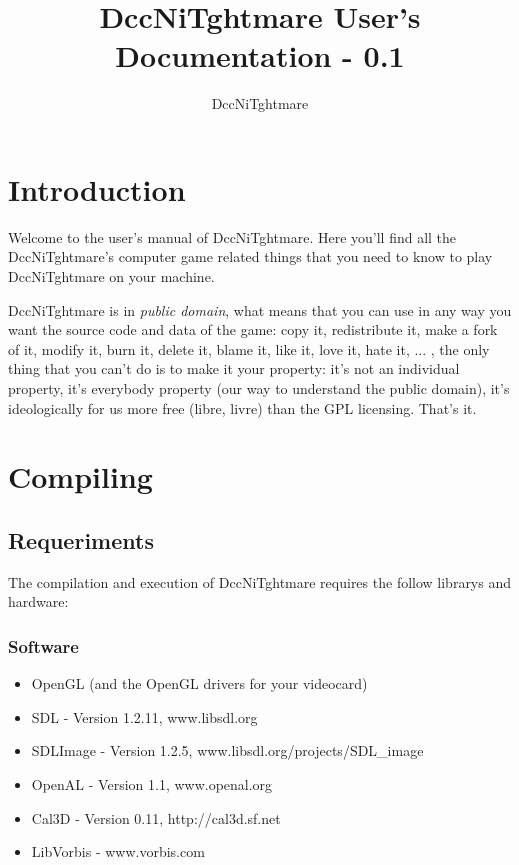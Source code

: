 \documentclass[ letterpaper,12pt]{article}
\begin{document}
\title{\textbf{DccNiTghtmare User's Documentation - 0.1}}

\author{
DccNiTghtmare
}

\maketitle




\newpage

\tableofcontents

\newpage

\section{Introduction}

Welcome to the user's manual of DccNiTghtmare. Here you'll find all the
DccNiTghtmare's computer game related things that you need to know to play
DccNiTghtmare on your machine. 

DccNiTghtmare is in {\it public domain}, what means that you can use in any way
you want the source code and data of the game: copy it, redistribute it, make a
fork of it, modify it, burn it, delete it, blame it, like it, love it, hate
it, ... , the only thing that you can't do is to make it your property: it's
not an individual property, it's everybody property (our way to understand the
public domain), it's ideologically for us more free (libre, livre) than the GPL
licensing. That's it.

\section{Compiling}

\subsection{Requeriments}

The compilation and execution of DccNiTghtmare requires the follow librarys and hardware:

\subsubsection{Software}
\begin{itemize}
\item{OpenGL (and the OpenGL drivers for your videocard)}
\item{SDL - Version 1.2.11, www.libsdl.org}
\item{SDLImage - Version 1.2.5, www.libsdl.org/projects/SDL\_image}
\item{OpenAL - Version 1.1, www.openal.org }
\item{Cal3D - Version 0.11, http://cal3d.sf.net}
\item{LibVorbis - www.vorbis.com}
\end{itemize}
\end{document}

